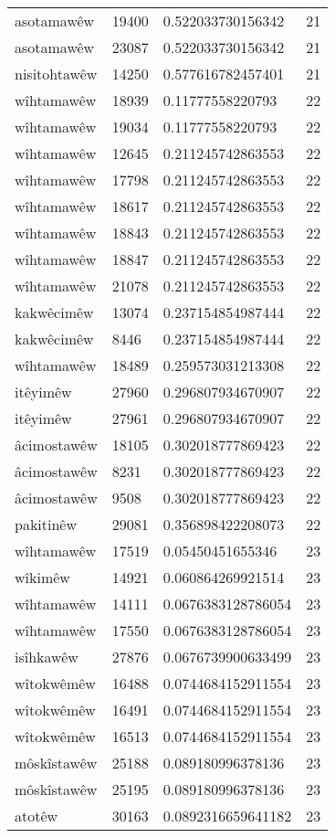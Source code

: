 \begin{longtable}{llll}
asotamawêw & 19400 & 0.522033730156342 & 21\\
asotamawêw & 23087 & 0.522033730156342 & 21\\
nisitohtawêw & 14250 & 0.577616782457401 & 21\\
wîhtamawêw & 18939 & 0.11777558220793 & 22\\
wîhtamawêw & 19034 & 0.11777558220793 & 22\\
wîhtamawêw & 12645 & 0.211245742863553 & 22\\
wîhtamawêw & 17798 & 0.211245742863553 & 22\\
wîhtamawêw & 18617 & 0.211245742863553 & 22\\
wîhtamawêw & 18843 & 0.211245742863553 & 22\\
wîhtamawêw & 18847 & 0.211245742863553 & 22\\
wîhtamawêw & 21078 & 0.211245742863553 & 22\\
kakwêcimêw & 13074 & 0.237154854987444 & 22\\
kakwêcimêw & 8446 & 0.237154854987444 & 22\\
wîhtamawêw & 18489 & 0.259573031213308 & 22\\
itêyimêw & 27960 & 0.296807934670907 & 22\\
itêyimêw & 27961 & 0.296807934670907 & 22\\
âcimostawêw & 18105 & 0.302018777869423 & 22\\
âcimostawêw & 8231 & 0.302018777869423 & 22\\
âcimostawêw & 9508 & 0.302018777869423 & 22\\
pakitinêw & 29081 & 0.356898422208073 & 22\\
wîhtamawêw & 17519 & 0.05450451655346 & 23\\
wîkimêw & 14921 & 0.060864269921514 & 23\\
wîhtamawêw & 14111 & 0.0676383128786054 & 23\\
wîhtamawêw & 17550 & 0.0676383128786054 & 23\\
isîhkawêw & 27876 & 0.0676739900633499 & 23\\
wîtokwêmêw & 16488 & 0.0744684152911554 & 23\\
wîtokwêmêw & 16491 & 0.0744684152911554 & 23\\
wîtokwêmêw & 16513 & 0.0744684152911554 & 23\\
môskîstawêw & 25188 & 0.089180996378136 & 23\\
môskîstawêw & 25195 & 0.089180996378136 & 23\\
atotêw & 30163 & 0.0892316659641182 & 23\\

\end{longtable}

